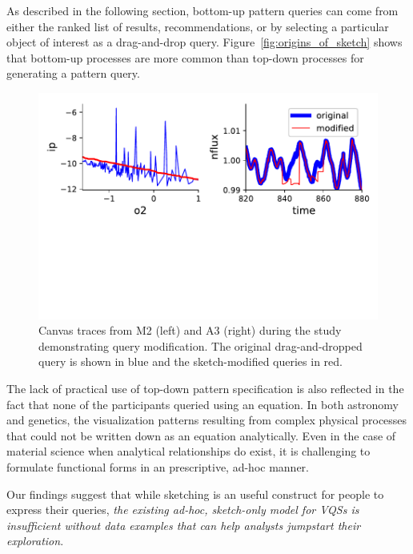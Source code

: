 As described in the following section, 
bottom-up pattern queries can come from either 
the ranked list of results, 
recommendations, or by selecting a 
particular object of interest as a drag-and-drop query. 
Figure~\ref{fig:origins_of_sketch} shows that 
bottom-up processes are more common 
than top-down processes for generating a pattern query.
\begin{figure}[h!]
    \centering
    \includegraphics[width=\columnwidth]{figures/QueryModificationBySketch.pdf}
    \caption{Canvas traces from M2 (left) and A3 (right) during the study demonstrating query modification. The original drag-and-dropped query is shown in blue and the sketch-modified queries in red.}
    \label{query_modification}
    \vspace{-10pt}
\end{figure}
\par The lack of practical use of top-down pattern 
specification is also reflected in the fact 
that none of the participants queried using an equation. 
In both astronomy and genetics, the visualization patterns 
resulting from complex physical processes 
that could not be written down as an equation analytically. 
Even in the case of material science when analytical 
relationships do exist, it is challenging to formulate 
functional forms in an prescriptive, ad-hoc manner.
\par Our findings suggest that while sketching 
is an useful construct for people to express their queries, 
\emph{the existing ad-hoc, sketch-only model for VQSs 
is insufficient without data examples 
that can help analysts jumpstart their exploration}. 
